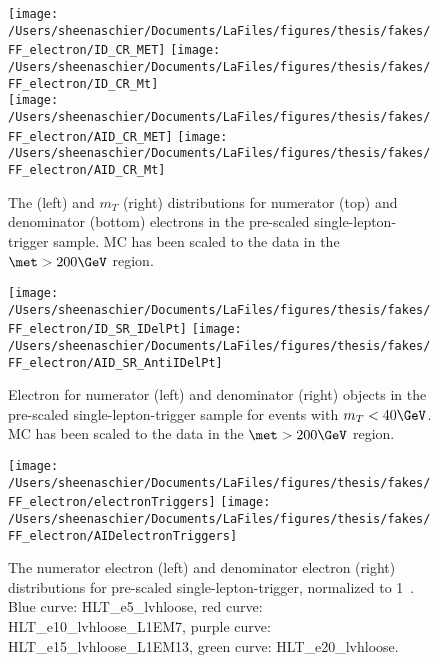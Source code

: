 \begin{figure}[tbp]
  \centering
  \texttt{[image: /Users/sheenaschier/Documents/LaFiles/figures/thesis/fakes/FF\_electron/ID\_CR\_MET]}
  \texttt{[image: /Users/sheenaschier/Documents/LaFiles/figures/thesis/fakes/FF\_electron/ID\_CR\_Mt]}\\
  \texttt{[image: /Users/sheenaschier/Documents/LaFiles/figures/thesis/fakes/FF\_electron/AID\_CR\_MET]}
  \texttt{[image: /Users/sheenaschier/Documents/LaFiles/figures/thesis/fakes/FF\_electron/AID\_CR\_Mt]}
  \caption{The \met{} (left) and $m_{T}$ (right) distributions for numerator (top) and denominator (bottom) electrons in the pre-scaled single-lepton-trigger sample.  MC has been scaled to the data in the $\met > 200\GeV$ region.}
  \label{fig:elec_FF_dists_1}
\end{figure}

\begin{figure}[tbp]
  \centering
  \texttt{[image: /Users/sheenaschier/Documents/LaFiles/figures/thesis/fakes/FF\_electron/ID\_SR\_IDelPt]}
  \texttt{[image: /Users/sheenaschier/Documents/LaFiles/figures/thesis/fakes/FF\_electron/AID\_SR\_AntiIDelPt]}\\
  \caption{Electron \pt{} for numerator (left) and denominator (right) objects in the pre-scaled single-lepton-trigger sample for events with $m_{T} < 40\GeV$.  MC has been scaled to the data in the $\met > 200\GeV$ region.}
  \label{fig:elec_FF_dists_pt}
\end{figure}

\begin{figure}[tbp]
  \centering
  \texttt{[image: /Users/sheenaschier/Documents/LaFiles/figures/thesis/fakes/FF\_electron/electronTriggers]}
  \texttt{[image: /Users/sheenaschier/Documents/LaFiles/figures/thesis/fakes/FF\_electron/AIDelectronTriggers]}\\
  \caption{The numerator electron (left) and denominator electron (right) \pt{} distributions for pre-scaled single-lepton-trigger, normalized to 1~\ipb{}. Blue curve: HLT\_e5\_lvhloose, red curve: HLT\_e10\_lvhloose\_L1EM7, purple curve: HLT\_e15\_lvhloose\_L1EM13, green curve: HLT\_e20\_lvhloose.}
  \label{fig:triggers}
\end{figure}


